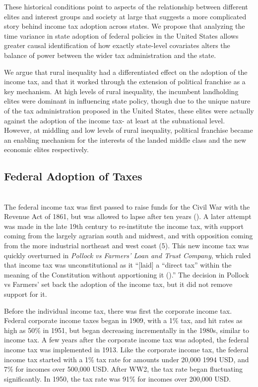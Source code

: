 \documentclass[letter, 12pt]{article}
\begin{document}
These historical conditions point to aspects of the relationship between different elites and interest groups and society at large that suggests a more complicated story behind income tax adoption across states. We propose that analyzing the time variance in state adoption of federal policies in the United States allows greater causal identification of how exactly state-level covariates alters the balance of power between the wider tax administration and the state. 

We argue that rural inequality had a differentiated effect on the adoption of the income tax, and that it worked through the extension of political franchise as a key mechanism. At high levels of rural inequality, the incumbent landholding elites were dominant in influencing state policy, though due to the unique nature of the tax administration proposed in the United States, these elites were actually against the adoption of the income tax- at least at the subnational level. However, at middling and low levels of rural inequality, political franchise became an enabling mechanism for the interests of the landed middle class and the new economic elites respectively. 


\subsection{Federal Adoption of Taxes}\hfill\\

The federal income tax was first passed to raise funds for the Civil War with the Revenue Act of 1861, but was allowed to lapse after ten years (\citealt{terrell2007history}). A later attempt was made in the late 19th century to re-institute the income tax, with support coming from the largely agrarian south and midwest, and with opposition coming from the more industrial northeast and west coast (\citealt{baack1985special}5). This new income tax was quickly overturned in \emph{Pollock vs Farmers’ Loan and Trust Company}, which ruled that income tax was unconstitutional as it “[laid] a “direct tax” within the meaning of the Constitution without apportioning it (\citealt{jones1895pollock}).” The decision in Pollock vs Farmers’ set back the adoption of the income tax, but it did not remove support for it.

Before the individual income tax, there was first the corporate income tax. Federal corporate income taxes began in 1909, with a 1\% tax, and hit rates as high as 50\% in 1951, but began decreasing incrementally in the 1980s, similar to income tax. A few years after the corporate income tax was adopted, the federal income tax was implemented in 1913. Like the corporate income tax, the federal income tax started with a 1\% tax rate for amounts under 20,000 1994 USD, and 7\% for incomes over 500,000 USD. After WW2, the tax rate began fluctuating significantly. In 1950, the tax rate was 91\% for incomes over 200,000 USD.
\end{document}
